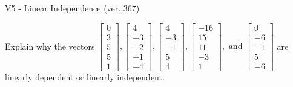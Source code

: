 \begin{exercise}
  \begin{exerciseTitle}V5 - Linear Independence (ver. 367)\end{exerciseTitle}
  \begin{exerciseStatement}
    Explain why the vectors \(\left[\begin{array}{r}
0 \\
3 \\
5 \\
5 \\
1
\end{array}\right] , \left[\begin{array}{r}
4 \\
-3 \\
-2 \\
-1 \\
-4
\end{array}\right] , \left[\begin{array}{r}
4 \\
-3 \\
-1 \\
5 \\
4
\end{array}\right] , \left[\begin{array}{r}
-16 \\
15 \\
11 \\
-3 \\
1
\end{array}\right] , \text{ and } \left[\begin{array}{r}
0 \\
-6 \\
-1 \\
5 \\
-6
\end{array}\right]\) are linearly dependent or linearly independent.	



\end{exerciseStatement}
\end{exercise}
